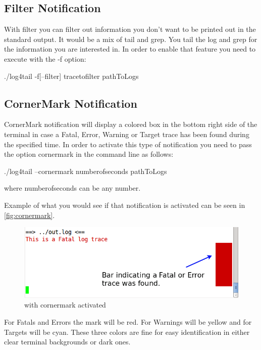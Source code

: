 \subsection{Filter Notification}
\label{sec:filter}
With filter you can filter out information you don't want to be printed out 
in the standard output. It would be a mix of tail and grep. You tail the log 
and grep for the information you are interested in. In order to enable that 
feature you need to execute \logftailer{} with the -f option:

\begin{cmd}
  ./log4tail -f[--filter] tracetofilter pathToLogs
\end{cmd}

\subsection{CornerMark Notification}
\label{sec:cornermark}
CornerMark notification will display a colored box in the bottom right side of
the terminal in case a Fatal, Error, Warning or Target trace has been found during the specified
time. In order to activate this type of notification you need to pass the
option cornermark in the command line as follows:

\begin{cmd}
  ./log4tail --cornermark numberofseconds pathToLogs
\end{cmd}
where numberofseconds can be any number. 

Example of what you would see if that notification is activated can be seen in
 \autoref{fig:cornermark}.

\begin{figure}
\centering
\includegraphics[scale=0.60]{terminalcornermark.png}
\caption{\logftailer{} with cornermark activated}\label{fig:cornermark}
\end{figure}

For Fatals and Errors the mark will be red. For Warnings will be yellow and for Targets 
will be cyan. These three colors are fine for easy identification in either clear terminal
backgrounds or dark ones.

